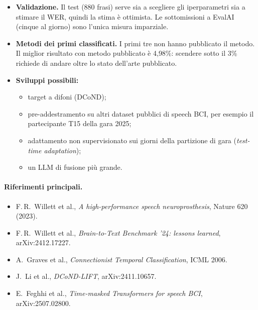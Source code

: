 \documentclass[10pt,a4paper]{article}
\begin{document}
\begin{itemize}\setlength\itemsep{1pt}
\item \textbf{Validazione.} Il test (880 frasi) serve sia a scegliere gli iperparametri sia a stimare il WER, quindi la stima è ottimista. Le sottomissioni a EvalAI (cinque al giorno) sono l'unica misura imparziale.
\item \textbf{Metodi dei primi classificati.} I primi tre non hanno pubblicato il metodo. Il miglior risultato con metodo pubblicato è 4{,}98\%: scendere sotto il 3\% richiede di andare oltre lo stato dell'arte pubblicato.
\item \textbf{Sviluppi possibili:}
  \begin{itemize}\setlength\itemsep{0pt}
  \item target a difoni (DCoND);
  \item pre-addestramento su altri dataset pubblici di speech BCI, per esempio il partecipante T15 della gara 2025;
  \item adattamento non supervisionato sui giorni della partizione di gara (\emph{test-time adaptation});
  \item un LLM di fusione più grande.
  \end{itemize}
\end{itemize}

\paragraph{Riferimenti principali.}
\begin{itemize}\setlength\itemsep{0pt}
\item F.\,R.\ Willett et al., \emph{A high-performance speech neuroprosthesis}, Nature 620 (2023).
\item F.\,R.\ Willett et al., \emph{Brain-to-Text Benchmark '24: lessons learned}, arXiv:2412.17227.
\item A.\ Graves et al., \emph{Connectionist Temporal Classification}, ICML 2006.
\item J.\ Li et al., \emph{DCoND-LIFT}, arXiv:2411.10657.
\item E.\ Feghhi et al., \emph{Time-masked Transformers for speech BCI}, arXiv:2507.02800.
\end{itemize}
\end{document}
